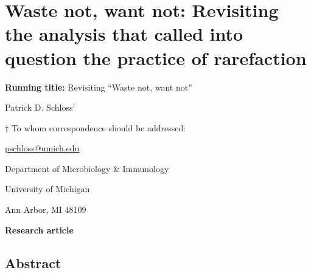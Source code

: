 \documentclass[
]{article}
\author{}
\date{\vspace{-2.5em}}
\begin{document}
\raggedright

\hypertarget{waste-not-want-not-revisiting-the-analysis-that-called-into-question-the-practice-of-rarefaction}{%
\section{Waste not, want not: Revisiting the analysis that called into
question the practice of
rarefaction}\label{waste-not-want-not-revisiting-the-analysis-that-called-into-question-the-practice-of-rarefaction}}

\vspace{20mm}

\textbf{Running title:} Revisiting ``Waste not, want not''

\vspace{20mm}

Patrick D. Schloss\({^\dagger}\)

\vspace{40mm}

\({\dagger}\) To whom correspondence should be addressed:

\href{mailto:pschloss@umich.edu}{pschloss@umich.edu}

Department of Microbiology \& Immunology

University of Michigan

Ann Arbor, MI 48109

\vspace{20mm}

\textbf{Research article}

\newpage

\hypertarget{abstract}{%
\subsection{Abstract}\label{abstract}}
\end{document}
